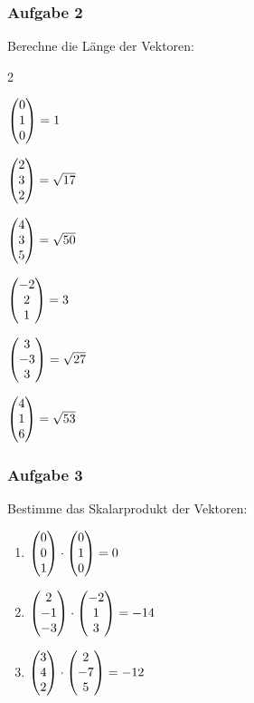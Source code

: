 	\subsubsection{Aufgabe 2}
	
		Berechne die Länge der Vektoren:
		
			\begin{enumerate}
			\end{enumerate}
		
	\subsubsection{Aufgabe 3}
		
		Bestimme das Skalarprodukt der Vektoren:
		
			\begin{enumerate}
				\item $\mvect{0\\0\\1} \cdot \mvect{0\\1\\0} = 0$
				\item $\mvect{2\\-1\\-3} \cdot \mvect{-2\\1\\3} = -14$
				\item $\mvect{3\\4\\2} \cdot \mvect{2\\-7\\5} = -12$
			\end{enumerate}
		
